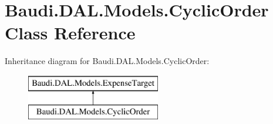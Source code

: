 \hypertarget{class_baudi_1_1_d_a_l_1_1_models_1_1_cyclic_order}{}\section{Baudi.\+D\+A\+L.\+Models.\+Cyclic\+Order Class Reference}
\label{class_baudi_1_1_d_a_l_1_1_models_1_1_cyclic_order}
Inheritance diagram for Baudi.\+D\+A\+L.\+Models.\+Cyclic\+Order\+:\begin{figure}[H]
\begin{center}
\leavevmode
\includegraphics[height=2.000000cm]{class_baudi_1_1_d_a_l_1_1_models_1_1_cyclic_order}
\end{center}
\end{figure}
